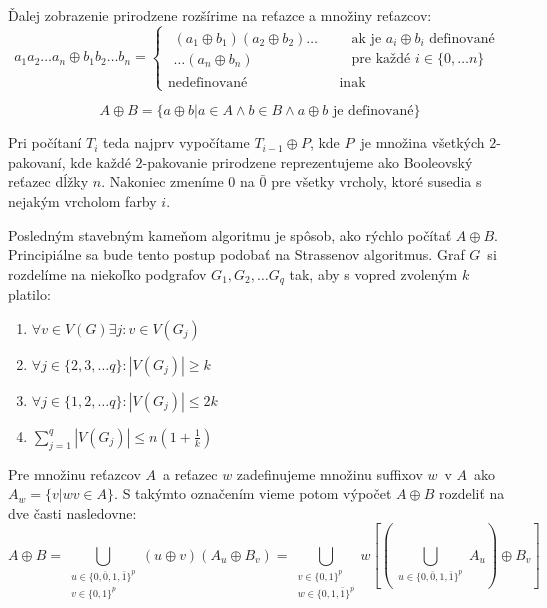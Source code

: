Ďalej zobrazenie prirodzene rozšírime na reťazce a množiny reťazcov:
\begin{equation}
    a_1 a_2 \ldots a_n \oplus b_1 b_2 \ldots b_n =
      \begin{cases}
          \begin{gathered}
            (a_1 \oplus b_1)(a_2 \oplus b_2) \ldots \\
            \ldots (a_n \oplus b_n)  
          \end{gathered} &
          \begin{aligned}
            & \textrm{ak je } a_i \oplus b_i \textrm{ definované} \\ 
            & \textrm{pre každé } i \in \{0, \ldots n\} 
          \end{aligned} \\
        \textrm{nedefinované} & \textrm{ inak}
      \end{cases}
\end{equation}

$$A \oplus B = \{ a \oplus b | a \in A \wedge b \in B \wedge a \oplus b \textrm{ je definované} \} $$

Pri počítaní $T_i$ teda najprv vypočítame $T_{i-1} \oplus P$, kde $P$ je množina všetkých $2$-pakovaní, kde
každé $2$-pakovanie prirodzene reprezentujeme ako Booleovský reťazec dĺžky $n$. Nakoniec zmeníme $0$ na $\bar{0}$ pre
všetky vrcholy, ktoré susedia s nejakým vrcholom farby $i$.

Posledným stavebným kameňom algoritmu je spôsob, ako rýchlo počítať $A \oplus B$. Principiálne
sa bude tento postup podobať na Strassenov algoritmus. Graf $G$ si rozdelíme na niekoľko podgrafov
$G_1, G_2, \ldots G_q$ tak, aby s vopred zvoleným $k$ platilo:

\begin{enumerate}
    \item $\forall v \in V(G) \exists j : v \in V(G_j)$
    \item $\forall j \in \{2, 3, \ldots q \} : |V(G_j)| \ge k$
    \item $\forall j \in \{ 1, 2, \ldots q \} : |V(G_j)| \leq 2k$
    \item $\sum_{j=1}^q |V(G_j)| \leq n(1 + \frac{1}{k})$
\end{enumerate}

Pre množinu reťazcov $A$ a reťazec $w$ zadefinujeme množinu suffixov $w$ v $A$ ako $A_w = \{v | wv \in A\}$.
S takýmto označením vieme potom výpočet $A \oplus B$ rozdeliť na dve časti nasledovne:
$$A \oplus B = \bigcup_{\substack{u \in \{0, \bar{0}, 1, \bar{1}\}^p \\ v \in \{0, 1\}^p \\ [u \oplus v \textrm{ je definované}]} }
(u \oplus v)(A_u \oplus B_v) = \bigcup_{\substack{v \in \{0, 1\}^p \\ w \in \{0, 1, \bar{1}\}^p}}
w \left[ \left( \bigcup_{\substack{u \in \{0, \bar{0}, 1, \bar{1}\}^p \\ [u \oplus v = w] }} A_u \right) \oplus B_v \right]$$

